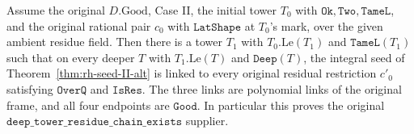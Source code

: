 \begin{theorem}
\label{thm:rh-deep-II-chain}
Assume the original \(D.\mathrm{Good}\), Case II, the initial
tower \(T_0\) with \(\texttt{Ok},\texttt{Two},\texttt{TameL}\),
and the original rational pair \(c_0\) with
\(\texttt{LatShape}\) at \(T_0\)'s mark, over the given ambient
residue field. Then there is a tower \(T_1\) with
\(T_0.\mathrm{Le}(T_1)\) and \(\texttt{TameL}(T_1)\) such that
on every deeper \(T\) with \(T_1.\mathrm{Le}(T)\) and
\(\texttt{Deep}(T)\), the integral seed of
Theorem~\ref{thm:rh-seed-II-alt} is linked to every original
residual restriction \(c'_0\) satisfying \(\texttt{OverQ}\)
and \(\texttt{IsRes}\). The three links are polynomial
links of the original frame, and all four endpoints are
\(\texttt{Good}\). In particular this proves the original
\(\texttt{deep\_tower\_residue\_chain\_exists}\) supplier.
\end{theorem}

